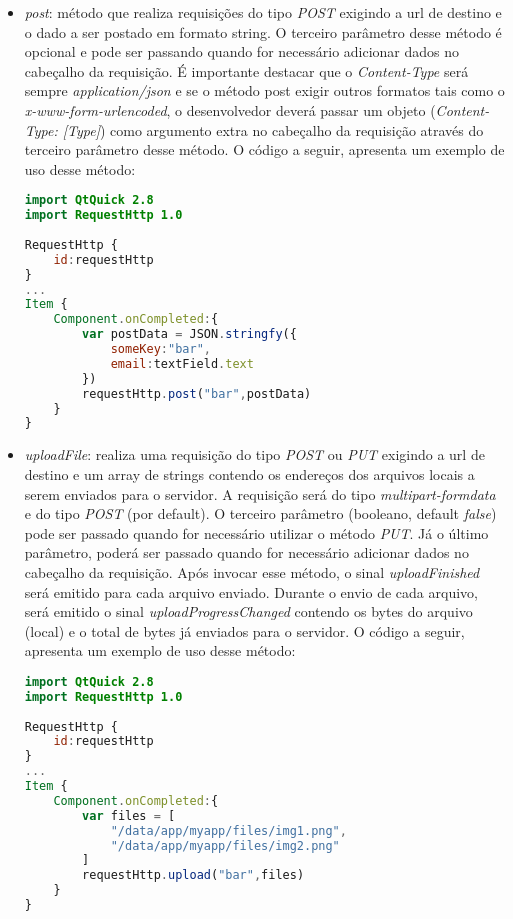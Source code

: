 \begin{itemize}
	\item \textit{post}: método que realiza requisições do tipo \textit{POST} exigindo a url de destino e o dado a ser postado em formato string. O terceiro parâmetro desse método é opcional e pode ser passando quando for necessário adicionar dados no cabeçalho da requisição. É importante destacar que o \textit{Content-Type} será sempre \textit{application/json} e se o método post exigir outros formatos tais como o \textit{x-www-form-urlencoded}, o desenvolvedor deverá passar um objeto (\textit{Content-Type: [Type]}) como argumento extra no cabeçalho da requisição através do terceiro parâmetro desse método. O código a seguir, apresenta um exemplo de uso desse método:
\begin{center}
\begin{lstlisting}[language=qml]
import QtQuick 2.8
import RequestHttp 1.0
	
RequestHttp {
	id:requestHttp
}
...
Item {
	Component.onCompleted:{
		var postData = JSON.stringfy({
			someKey:"bar",
			email:textField.text
		})
		requestHttp.post("bar",postData)
	}
}
\end{lstlisting}
\end{center}

	\item \textit{uploadFile}: realiza uma requisição do tipo \textit{POST} ou \textit{PUT} exigindo a url de destino e um array de strings contendo os endereços dos arquivos locais a serem enviados para o servidor. A requisição será do tipo \textit{multipart-formdata} e do tipo \textit{POST} (por default). O terceiro parâmetro (booleano, default \textit{false}) pode ser passado quando for necessário utilizar o método \textit{PUT}. Já o último parâmetro, poderá ser passado quando for necessário adicionar dados no cabeçalho da requisição. Após invocar esse método, o sinal \textit{uploadFinished} será emitido para cada arquivo enviado. Durante o envio de cada arquivo, será emitido o sinal \textit{uploadProgressChanged} contendo os bytes do arquivo (local) e o total de bytes já enviados para o servidor. O código a seguir, apresenta um exemplo de uso desse método:
\begin{center}
\begin{lstlisting}[language=qml]
import QtQuick 2.8
import RequestHttp 1.0
	
RequestHttp {
	id:requestHttp
}
...
Item {
	Component.onCompleted:{
		var files = [
			"/data/app/myapp/files/img1.png",
			"/data/app/myapp/files/img2.png"
		]
		requestHttp.upload("bar",files)
	}
}
\end{lstlisting}
\end{center}


\end{itemize}
